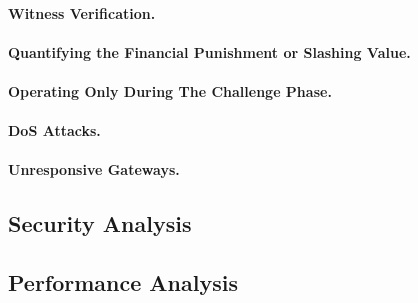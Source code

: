 \paragraph{Witness Verification.}


\paragraph{Quantifying the Financial Punishment or Slashing Value.}


\paragraph{Operating Only During The Challenge Phase.}


\paragraph{DoS Attacks.}

\paragraph{Unresponsive Gateways.}


\subsection{Security Analysis}


\subsection{Performance Analysis}